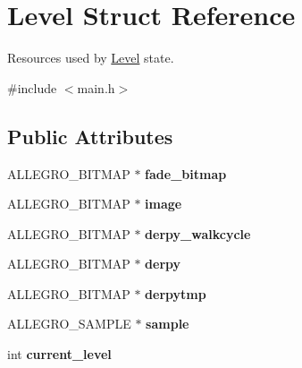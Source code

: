 \hypertarget{structLevel}{\section{\-Level \-Struct \-Reference}
\label{structLevel}
}


\-Resources used by \hyperlink{structLevel}{\-Level} state.  




{\ttfamily \#include $<$main.\-h$>$}

\subsection*{\-Public \-Attributes}
\begin{DoxyCompactItemize}
\item 
\hypertarget{structLevel_a1a9629222f6536790772ad7af5d2413c}{\-A\-L\-L\-E\-G\-R\-O\-\_\-\-B\-I\-T\-M\-A\-P $\ast$ {\bfseries fade\-\_\-bitmap}}\label{structLevel_a1a9629222f6536790772ad7af5d2413c}

\item 
\hypertarget{structLevel_a79a543baeb9069256d9a2f41911f2908}{\-A\-L\-L\-E\-G\-R\-O\-\_\-\-B\-I\-T\-M\-A\-P $\ast$ {\bfseries image}}\label{structLevel_a79a543baeb9069256d9a2f41911f2908}

\item 
\hypertarget{structLevel_a2fa5b778e5677296c942ac402e123b8d}{\-A\-L\-L\-E\-G\-R\-O\-\_\-\-B\-I\-T\-M\-A\-P $\ast$ {\bfseries derpy\-\_\-walkcycle}}\label{structLevel_a2fa5b778e5677296c942ac402e123b8d}

\item 
\hypertarget{structLevel_ab741480bbb363a4d5960add0efbd3c86}{\-A\-L\-L\-E\-G\-R\-O\-\_\-\-B\-I\-T\-M\-A\-P $\ast$ {\bfseries derpy}}\label{structLevel_ab741480bbb363a4d5960add0efbd3c86}

\item 
\hypertarget{structLevel_a086dacd09afa55e8e142ac73e2099123}{\-A\-L\-L\-E\-G\-R\-O\-\_\-\-B\-I\-T\-M\-A\-P $\ast$ {\bfseries derpytmp}}\label{structLevel_a086dacd09afa55e8e142ac73e2099123}

\item 
\hypertarget{structLevel_a234fa7b9ec35dd360e4e3c48a944fc7d}{\-A\-L\-L\-E\-G\-R\-O\-\_\-\-S\-A\-M\-P\-L\-E $\ast$ {\bfseries sample}}\label{structLevel_a234fa7b9ec35dd360e4e3c48a944fc7d}

\item 
\hypertarget{structLevel_a1ba3ee0104c912dde5d6e70fee889512}{int {\bfseries current\-\_\-level}}\label{structLevel_a1ba3ee0104c912dde5d6e70fee889512}


\end{DoxyCompactItemize}
